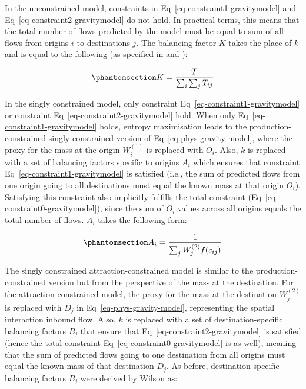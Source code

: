 \documentclass[
  10pt,
  letterpaper,
]{article}
\begin{document}
In the unconstrained model, constraints in
Eq~\ref{eq-constraint1-gravitymodel} and
Eq~\ref{eq-constraint2-gravitymodel} do not hold. In practical terms,
this means that the total number of flows predicted by the model must be
equal to sum of all flows from origins \(i\) to destinations \(j\). The
balancing factor \(K\) takes the place of \(k\) and is equal to the
following (as specified in \citep{cliff_evaluating_1974} and
\citep{fotheringham_spatial_1984}):

\begin{equation}\phantomsection\label{eq-total-flow-balancing-factor}{
K=\frac{T}{\sum_i\sum_j T_{ij}}
}\end{equation}

In the singly constrained model, only constraint
Eq~\ref{eq-constraint1-gravitymodel} or constraint
Eq~\ref{eq-constraint2-gravitymodel} hold. When only
Eq~\ref{eq-constraint1-gravitymodel} holds, entropy maximisation leads
to the production-constrained singly constrained version of
Eq~\ref{eq-phys-gravity-model}, where the proxy for the mass at the
origin \(W_i^{(1)}\) is replaced with \(O_i\). Also, \(k\) is replaced
with a set of balancing factors specific to origins \(A_i\) which
ensures that constraint Eq~\ref{eq-constraint1-gravitymodel} is
satisfied (i.e., the sum of predicted flows from one origin going to all
destinations must equal the known mass at that origin \(O_i\)).
Satisfying this constraint also implicitly fulfills the total constraint
(Eq~\ref{eq-constraint0-gravitymodel}), since the sum of \(O_i\) values
across all origins equals the total number of flows. \(A_i\) takes the
following form:

\begin{equation}\phantomsection\label{eq-production-constrained-balancing-factor}{
A_i = \frac{1}{\sum_j W_j^{(2)} f(c_{ij})}
}\end{equation}

The singly constrained attraction-constrained model is similar to the
production-constrained version but from the perspective of the mass at
the destination. For the attraction-constrained model, the proxy for the
mass at the destination \(W_j^{(2)}\) is replaced with \(D_j\) in
Eq~\ref{eq-phys-gravity-model}, representing the spatial interaction
inbound flow. Also, \(k\) is replaced with a set of destination-specific
balancing factors \(B_j\) that ensure that
Eq~\ref{eq-constraint2-gravitymodel} is satisfied (hence the total
constraint Eq~\ref{eq-constraint0-gravitymodel} is as well), meaning
that the sum of predicted flows going to one destination from all
origins must equal the known mass of that destination \(D_j\). As
before, destination-specific balancing factors \(B_j\) were derived by
Wilson as:
\end{document}
